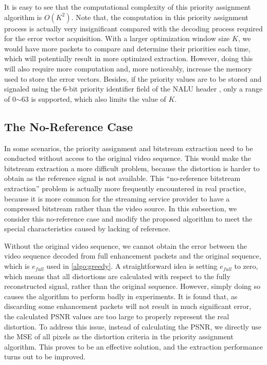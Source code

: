 \documentclass[journal,draftclsnofoot,onecolumn]{IEEEtran}
\begin{document}
It is easy to see that the computational complexity of this priority assignment algorithm is $O(K^2)$. Note that, the computation in this priority assignment process is actually very insignificant compared with the decoding process required for the error vector acquisition. With a larger optimization window size $K$, we would have more packets to compare and determine their priorities each time, which will potentially result in more optimized extraction. However, doing this will also require more computation and, more noticeably, increase the memory used to store the error vectors. Besides, if the priority values are to be stored and signaled using the 6-bit priority identifier field of the NALU header \cite{Amonou07}, only a range of 0$\sim$63 is supported, which also limits the value of $K$.

\subsection{The No-Reference Case}
\label{subsec:noref-case}

In some scenarios, the priority assignment and bitstream extraction need to be conducted without access to the original video sequence. This would make the bitstream extraction a more difficult problem, because the distortion is harder to obtain as the reference signal is not available. This ``no-reference bitstream extraction'' problem is actually more frequently encountered in real practice, because it is more common for the streaming service provider to have a compressed bitstream rather than the video source. In this subsection, we consider this no-reference case and modify the proposed algorithm to meet the special characteristics caused by lacking of reference.

Without the original video sequence, we cannot obtain the error between the video sequence decoded from full enhancement packets and the original sequence, which is $e_{full}$ used in \ref{algo:greedy}. A straightforward idea is setting $e_{full}$ to zero, which means that all distortions are calculated with respect to the fully reconstructed signal, rather than the original sequence. However, simply doing so causes the algorithm to perform badly in experiments. It is found that, as discarding some enhancement packets will not result in much significant error, the calculated PSNR values are too large to properly represent the real distortion. To address this issue, instead of calculating the PSNR, we directly use the MSE of all pixels as the distortion criteria in the priority assignment algorithm. This proves to be an effective solution, and the extraction performance turns out to be improved.
\end{document}
